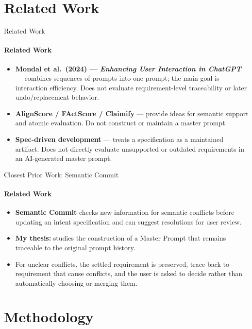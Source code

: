 \documentclass[aspectratio=169,11pt,c]{beamer}
\begin{document}
\section{Related Work}

\begin{frame}{Related Work}
  \framesubtitle{Related Work}
  \small
  \begin{itemize}
    \item \textbf{Mondal et al.\ (2024) --- \textit{Enhancing User Interaction in ChatGPT}} --- combines sequences of prompts into one prompt; the main goal is interaction efficiency. Does not evaluate requirement-level traceability or later undo/replacement behavior.
    \item \textbf{AlignScore / FActScore / Claimify} --- provide ideas for semantic support and atomic evaluation. Do not construct or maintain a master prompt.
    \item \textbf{Spec-driven development} --- treats a specification as a maintained artifact. Does not directly evaluate unsupported or outdated requirements in an AI-generated master prompt.
  \end{itemize}
\end{frame}

\begin{frame}{Closest Prior Work: Semantic Commit}
  \framesubtitle{Related Work}
  \begin{itemize}
    \item \textbf{Semantic Commit} checks new information for semantic conflicts before updating an intent specification and can suggest resolutions for user review.
    \item \textbf{My thesis:} studies the construction of a Master Prompt that remains traceable to the original  prompt history.
    \item For unclear conflicts, the settled requirement is preserved, trace back to requirement that cause conflicts, and the user is asked to decide rather than automatically choosing or merging them.
  \end{itemize}
\end{frame}

\section{Methodology}
\end{document}

